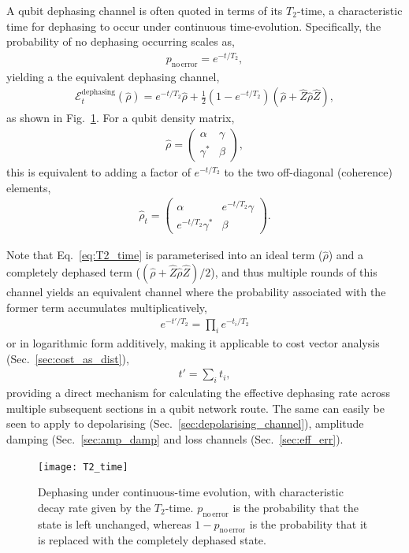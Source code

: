A qubit dephasing channel is often quoted in terms of its $T_2$-time, a characteristic time for dephasing to occur under continuous time-evolution. Specifically, the probability of no dephasing occurring scales as,
\begin{align}
p_\mathrm{no\,error} = e^{-t/T_2},	
\end{align}
yielding a the equivalent dephasing channel,
\begin{align} \label{eq:T2_time}
\mathcal{E}_t^\mathrm{dephasing}(\hat\rho) = e^{-t/T_2} \hat\rho + \frac{1}{2}(1-e^{-t/T_2})(\hat\rho + \hat{Z}\hat\rho\hat{Z}),
\end{align}
as shown in Fig.~\ref{fig:T2_time}. For a qubit density matrix,
\begin{align}
	\hat\rho = \begin{pmatrix}
 \alpha & \gamma \\
 \gamma^* & \beta
\end{pmatrix},
\end{align}
this is equivalent to adding a factor of $e^{-t/T_2}$ to the two off-diagonal (coherence) elements,
\begin{align}
	\hat\rho_t = \begin{pmatrix}
 \alpha & e^{-t/T_2}\gamma \\
 e^{-t/T_2}\gamma^* & \beta
\end{pmatrix}.
\end{align}

Note that Eq.~\eqref{eq:T2_time} is parameterised into an ideal term ($\hat\rho$) and a completely dephased term ($(\hat\rho+\hat{Z}\hat\rho\hat{Z})/2$), and thus multiple rounds of this channel yields an equivalent channel where the probability associated with the former term accumulates multiplicatively,
\begin{align}
e^{-t'/T_2} = \prod_i e^{-t_i/T_2}	
\end{align}
or in logarithmic form additively, making it applicable to cost vector analysis (Sec.~\ref{sec:cost_as_dist}),
\begin{align}
t' = \sum_i t_i,	
\end{align}
providing a direct mechanism for calculating the effective dephasing rate across multiple subsequent sections in a qubit network route. The same can easily be seen to apply to depolarising (Sec.~\ref{sec:depolarising_channel}), amplitude damping (Sec.~\ref{sec:amp_damp} and loss channels (Sec.~\ref{sec:eff_err}).

\begin{figure}[!htbp]
	\texttt{[image: T2\_time]}
	\captionspacefig \caption{Dephasing under continuous-time evolution, with characteristic decay rate given by the $T_2$-time. $p_\mathrm{no\,error}$ is the probability that the state is left unchanged, whereas \mbox{$1-p_\mathrm{no\,error}$} is the probability that it is replaced with the completely dephased state.}\label{fig:T2_time}
\end{figure}


